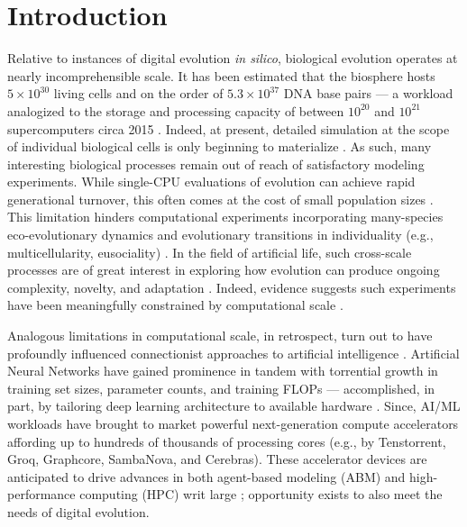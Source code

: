 \section{Introduction} \label{moreno:sec:introduction}

Relative to instances of digital evolution \textit{in silico}, biological evolution operates at nearly incomprehensible scale.
It has been estimated that the biosphere hosts $5 \times 10^{30}$ living cells and on the order of $5.3 \times 10^{37}$ DNA base pairs --- a workload analogized to the storage and processing capacity of between $10^{20}$ and $10^{21}$ supercomputers circa 2015 \cite{Landenmark2015}.
Indeed, at present, detailed simulation at the scope of individual biological cells is only beginning to materialize \cite{Thornburg2026}.
As such, many interesting biological processes remain out of reach of satisfactory modeling experiments.
While single-CPU evaluations of evolution can achieve rapid generational turnover, this often comes at the cost of small population sizes \cite{moreno2022engineering}.
This limitation hinders computational experiments incorporating many-species eco-evolutionary dynamics and evolutionary transitions in individuality (e.g., multicellularity, eusociality) \cite{penczykowski2016understanding,alizon2012modelling,schreiber2021cross}.
In the field of artificial life, such cross-scale processes are of great interest in exploring how evolution can produce ongoing complexity, novelty, and adaptation \cite{taylor2016open,dolson2021digital,taylor2019evolutionary,ackley2014indefinitely}.
Indeed, evidence suggests such experiments have been meaningfully constrained by computational scale \cite{channon2019maximum}.

Analogous limitations in computational scale, in retrospect, turn out to have profoundly influenced connectionist approaches to artificial intelligence \cite{kaplan2020scaling}.
Artificial Neural Networks have gained prominence in tandem with torrential growth in training set sizes, parameter counts, and training FLOPs \cite{marcus2018deep} --- accomplished, in part, by tailoring deep learning architecture to available hardware \cite{krizhevsky2012imagenet}.
Since, AI/ML workloads have brought to market powerful next-generation compute accelerators affording up to hundreds of thousands of processing cores (e.g., by Tenstorrent, Groq, Graphcore, SambaNova, and Cerebras)\cite{zhang2016cambricon,emani2021accelerating,jia2019dissecting,medina2020habana}.
These accelerator devices are anticipated to drive advances in both agent-based modeling (ABM) and high-performance computing (HPC) writ large \cite{perumalla2022computer,VanEssendelft2025}; opportunity exists to also meet the needs of digital evolution.

